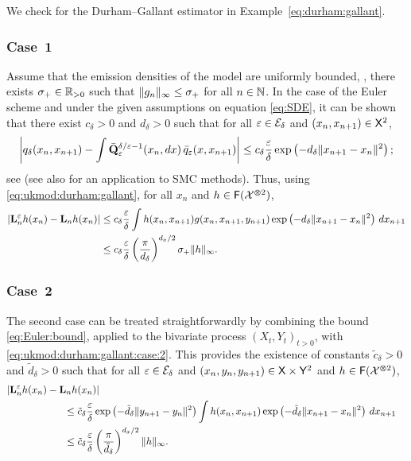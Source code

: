 \begin{example}
We check  for the Durham--Gallant estimator in Example~\ref{eq:durham:gallant}. 

\subsubsection*{Case~1}
Assume that the emission densities of the model are uniformly bounded, \ie, there exists $\sigma_+ \in \mathbb{R}_{> 0}$ such that $\| g_{n} \|_\infty \leq \sigma_+$ for all $n \in \mathbb{N}$. In the case of the Euler scheme and under the given assumptions on equation \eqref{eq:SDE}, it can be shown that there exist $c_\delta > 0$ and $d_\delta > 0$ such that for all $\varepsilon \in \mathcal{E}_\delta$ and $(x_n, x_{n + 1}) \in \mathsf{X}^2$, 
\begin{equation} \label{eq:Euler:bound}
\left| q_\delta(x_n, x_{n + 1}) - \int \bar{\kernel{Q}}^{\delta / \precpar - 1}_\precpar(x_n, \rmd x) \, \bar{q}_\precpar(x, x_{n + 1}) \right|\leq c_\delta \frac{\precpar}{\delta} \exp \left( - d_\delta \| x_{n + 1} - x_n \|^2\right);  
\end{equation}
see \cite{bally:talay:1996} (see also \cite{delmoral:jacod:2001} for an application to SMC methods). Thus, using \eqref{eq:ukmod:durham:gallant}, for all $x_n$ and $h \in \mathsf{F}(\mathcal{X}^{\varotimes 2})$,
\begin{align*}
\left|\ukmod{n} h (x_n) - \uk{n} h (x_n) \right|&\leq c_\delta \frac{\precpar}{\delta} \int h(x_n, x_{n + 1}) g(x_n, x_{n + 1}, y_{n + 1}) \exp \left( - d_\delta \| x_{n + 1} - x_n \|^2\right) \, \rmd x_{n + 1} \\
&\leq c_\delta \frac{\precpar}{\delta} \left( \frac{\pi}{d_\delta} \right)^{d_x / 2} \sigma_+ \|h \|_\infty.  
\end{align*}

\subsubsection*{Case~2}

The second case can be treated straightforwardly by combining the bound \eqref{eq:Euler:bound}, applied to the bivariate process $(X_t, Y_t)_{t > 0}$, with \eqref{eq:ukmod:durham:gallant:case:2}. This provides the existence of constants $\tilde{c}_\delta > 0$ and $\tilde{d}_\delta > 0$ such that for all $\varepsilon \in \mathcal{E}_\delta$ and $(x_n, y_n, y_{n + 1}) \in \mathsf{X} \times \mathsf{Y}^2$ and $h \in \mathsf{F}(\mathcal{X}^{\varotimes 2})$,  
\begin{align*}
\lefteqn{\left|\ukmod{n} h (x_n) - \uk{n} h (x_n) \right|}\hspace{20mm} \\
&\leq \tilde{c}_\delta \frac{\precpar}{\delta} \exp \left( - \tilde{d}_\delta \| y_{n + 1} -y_n \|^2\right) \int h(x_n, x_{n + 1}) \exp \left( - \tilde{d}_\delta \| x_{n + 1} - x_n \|^2\right) \, \rmd x_{n + 1} \\
&\leq \tilde{c}_\delta \frac{\precpar}{\delta} \left( \frac{\pi}{\tilde{d}_\delta} \right)^{d_x / 2} \|h \|_\infty.  
\end{align*}

\end{example}

